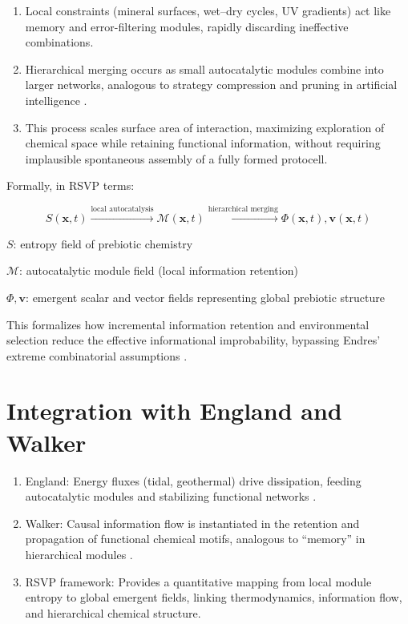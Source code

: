 \documentclass{book}
\begin{document}
\begin{enumerate}
\item Local constraints (mineral surfaces, wet–dry cycles, UV gradients) act like memory and error-filtering modules, rapidly discarding ineffective combinations.
\item Hierarchical merging occurs as small autocatalytic modules combine into larger networks, analogous to strategy compression and pruning in artificial intelligence \citep{scalinghypothesis}.
\item This process scales surface area of interaction, maximizing exploration of chemical space while retaining functional information, without requiring implausible spontaneous assembly of a fully formed protocell.
\end{enumerate}

Formally, in RSVP terms:

\[S(\mathbf{x}, t) \xrightarrow{\text{local autocatalysis}} \mathcal{M}(\mathbf{x}, t) \xrightarrow{\text{hierarchical merging}} \Phi(\mathbf{x}, t), \mathbf{v}(\mathbf{x}, t)\]

$S$: entropy field of prebiotic chemistry

$\mathcal{M}$: autocatalytic module field (local information retention)

$\Phi, \mathbf{v}$: emergent scalar and vector fields representing global prebiotic structure

This formalizes how incremental information retention and environmental selection reduce the effective informational improbability, bypassing Endres’ extreme combinatorial assumptions \citep{day2024}.

\section{Integration with England and Walker}
\begin{enumerate}
\item England: Energy fluxes (tidal, geothermal) drive dissipation, feeding autocatalytic modules and stabilizing functional networks \citep{england2015}.
\item Walker: Causal information flow is instantiated in the retention and propagation of functional chemical motifs, analogous to “memory” in hierarchical modules \citep{walker2017}.
\item RSVP framework: Provides a quantitative mapping from local module entropy to global emergent fields, linking thermodynamics, information flow, and hierarchical chemical structure.
\end{enumerate}
\end{document}
